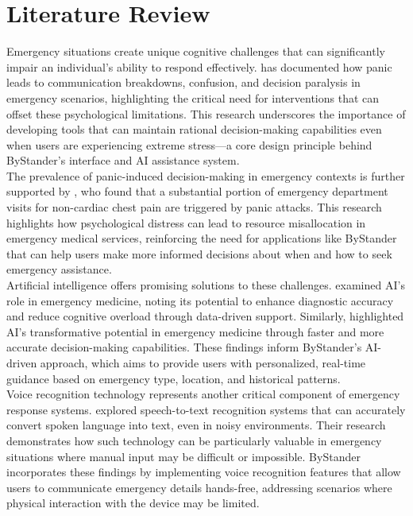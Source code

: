 \section{Literature Review}
\label{section:literature-review}


Emergency situations create unique cognitive challenges that can significantly impair an individual's ability to respond effectively. \cite{aguirre2005emergency} has documented how panic leads to communication breakdowns, confusion, 
and decision paralysis in emergency scenarios, highlighting the critical need for interventions that can offset these psychological limitations. 
This research underscores the importance of developing tools that can maintain rational decision-making capabilities even when users are experiencing extreme stress—a core design principle 
behind ByStander's interface and AI assistance system. \\

The prevalence of panic-induced decision-making in emergency contexts is further supported 
by \cite{foldesbusque2017closer}, who found that a substantial portion of emergency department 
visits for non-cardiac chest pain are triggered by panic attacks. This research highlights how psychological 
distress can lead to resource misallocation in emergency medical services, reinforcing the need for applications like ByStander that can help users make more informed decisions about when and how to seek emergency assistance. \\ 

Artificial intelligence offers promising solutions to these challenges. \cite{kirubarajan2020artificial} examined AI's role 
in emergency medicine, noting its potential to enhance diagnostic accuracy and reduce cognitive overload through data-driven support. 
Similarly, \cite{kiran2020artificial} highlighted AI's transformative potential in emergency medicine through faster and more accurate 
decision-making capabilities. These findings inform ByStander's AI-driven approach, which aims to provide users with personalized, 
real-time guidance based on emergency type, location, and historical patterns. \\ 

Voice recognition technology represents another critical component of emergency response systems. \cite{voice_recognition} 
explored speech-to-text recognition systems that can accurately convert spoken language into text, even in noisy environments. 
Their research demonstrates how such technology can be particularly valuable in emergency situations where manual input may be difficult 
or impossible. ByStander incorporates these findings by implementing voice recognition features that allow users to communicate emergency 
details hands-free, addressing scenarios where physical interaction with the device may be limited. \\

